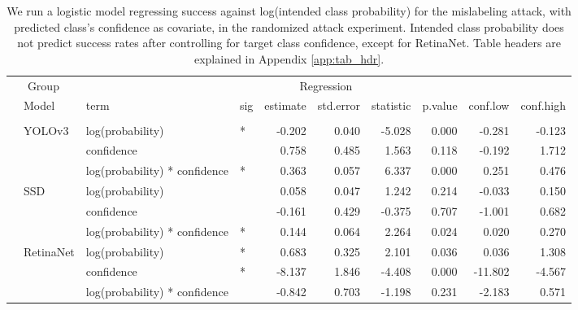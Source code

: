 \documentclass[
]{article}
\begin{document}
\begin{longtable}[t]{llllrrrrrr}
\caption{\label{tab:mislabel_conf_table}We run a logistic model regressing success against log(intended class probability) for the mislabeling attack, with predicted class's confidence as covariate, in the randomized attack experiment. Intended class probability does not predict success rates after controlling for target class confidence, except for RetinaNet. Table headers are explained in Appendix \ref{app:tab_hdr}.}\\
\toprule
\multicolumn{2}{c}{Group} & \multicolumn{8}{c}{Regression} \\
\cmidrule(l{3pt}r{3pt}){1-2} \cmidrule(l{3pt}r{3pt}){3-10}
 & Model & term & sig & estimate & std.error & statistic & p.value & conf.low & conf.high\\
\midrule
\addlinespace[0.3em]
\multicolumn{10}{l}{\textbf{Mislabeling}}\\
\hspace{1em} & YOLOv3 & log(probability) & * & -0.202 & 0.040 & -5.028 & 0.000 & -0.281 & -0.123\\
\cmidrule{3-10}\nopagebreak
\hspace{1em} &  & confidence &  & 0.758 & 0.485 & 1.563 & 0.118 & -0.192 & 1.712\\
\cmidrule{3-10}\nopagebreak
\hspace{1em} &  & log(probability) * confidence & * & 0.363 & 0.057 & 6.337 & 0.000 & 0.251 & 0.476\\
\cmidrule{2-10}\nopagebreak
\hspace{1em} & SSD & log(probability) &  & 0.058 & 0.047 & 1.242 & 0.214 & -0.033 & 0.150\\
\cmidrule{3-10}\nopagebreak
\hspace{1em} &  & confidence &  & -0.161 & 0.429 & -0.375 & 0.707 & -1.001 & 0.682\\
\cmidrule{3-10}\nopagebreak
\hspace{1em} &  & log(probability) * confidence & * & 0.144 & 0.064 & 2.264 & 0.024 & 0.020 & 0.270\\
\cmidrule{2-10}\nopagebreak
\hspace{1em} & RetinaNet & log(probability) & * & 0.683 & 0.325 & 2.101 & 0.036 & 0.036 & 1.308\\
\cmidrule{3-10}\nopagebreak
\hspace{1em} &  & confidence & * & -8.137 & 1.846 & -4.408 & 0.000 & -11.802 & -4.567\\
\cmidrule{3-10}\nopagebreak
\hspace{1em} &  & log(probability) * confidence &  & -0.842 & 0.703 & -1.198 & 0.231 & -2.183 & 0.571\\

\end{longtable}
\end{document}
